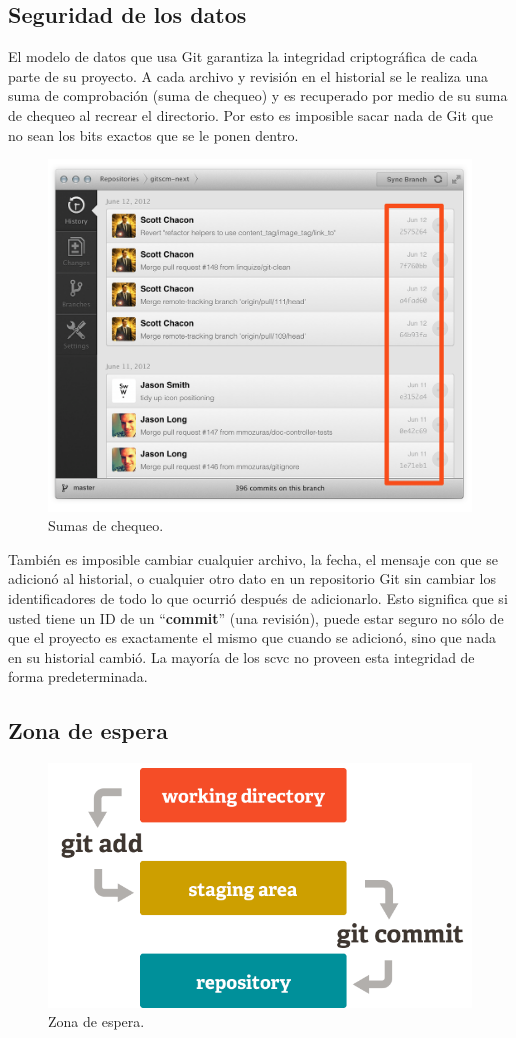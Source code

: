 \documentclass[12pt, spanish, oneside, onecolumn, a4paper]{report}
\begin{document}
\subsection{Seguridad de los datos} 
\label{sec:dataassurance} El modelo de datos que usa Git garantiza la integridad criptográfica de cada parte de su proyecto. A cada archivo y revisión en el historial se le realiza una suma de comprobación (suma de chequeo) y es recuperado por medio de su suma de chequeo al recrear el directorio. Por esto es imposible sacar nada de Git que no sean los bits exactos que se le ponen dentro. 
\begin{figure} 
  \begin{center} 
    \includegraphics[width=.6\textwidth,keepaspectratio=true]{assurance.png} 
  \end{center} 
  \caption{Sumas de chequeo.} 
\end{figure} También es imposible cambiar cualquier archivo, la fecha, el mensaje con que se adicionó al historial, o cualquier otro dato en un repositorio Git sin cambiar los identificadores de todo lo que ocurrió después de adicionarlo. Esto significa que si usted tiene un ID de un ``\textbf{commit}'' (una revisión), puede estar seguro no sólo de que el proyecto es exactamente el mismo que cuando se adicionó, sino que nada en su historial cambió. La mayoría de los 
\gls{scvc} no proveen esta integridad de forma predeterminada. 
\clearpage 
\subsection{Zona de espera} 
\label{sec:stagingarea} 
\begin{figure} 
  \begin{center} 
    \includegraphics[width=.6\textwidth,keepaspectratio=true]{index1.png} 
  \end{center} 
  \caption{Zona de espera.} 
\end{figure}
\end{document}
